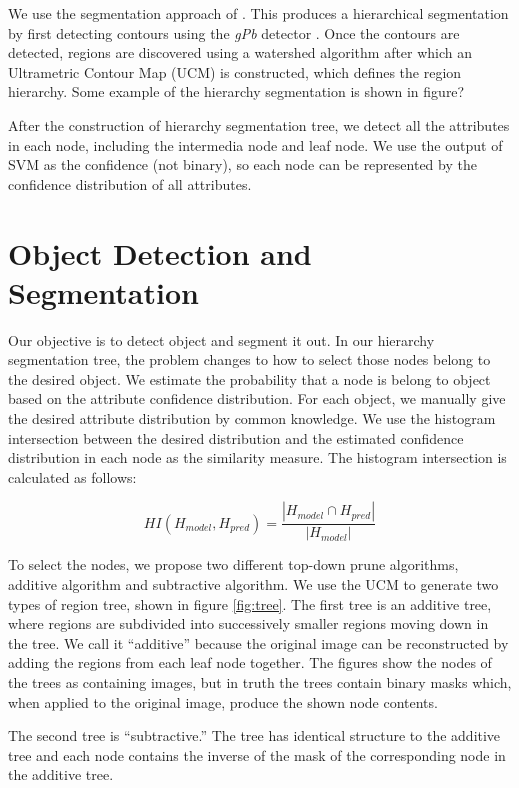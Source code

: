 \documentclass[10pt,twocolumn,letterpaper]{article}
\begin{document}
We use the segmentation
approach of \cite{arbelaez09}.  This produces a hierarchical
segmentation by first detecting contours using the \emph{gPb} detector
\cite{maire08}.  Once the contours are detected, regions are discovered using a
watershed algorithm after which an Ultrametric Contour Map (UCM) is constructed,
which defines the region hierarchy. Some example of the hierarchy segmentation is shown in figure?

After the construction of hierarchy segmentation tree, we detect all the attributes in each node, including the intermedia node and leaf node. We use the output of SVM as the confidence (not binary), so each node can be represented by the confidence distribution of all attributes.


\section{Object Detection and Segmentation}
\label{sec:detection}

Our objective is to detect object and segment it out. In our hierarchy segmentation tree, the problem changes to how to select those nodes belong to the desired object. We estimate the probability that a node is belong to object based on the attribute confidence distribution. For each object, we manually give the desired attribute distribution by common knowledge. We use the histogram intersection between the desired distribution and the estimated confidence distribution in each node as the similarity measure. The histogram intersection is calculated as follows:
 
\[ HI(H_{model},H_{pred}) = \frac{|H_{model} \cap H_{pred}|}{|H_{model}|} \]


To select the nodes, we propose two different top-down prune algorithms, additive algorithm and subtractive algorithm. We use the UCM to generate two types of region tree, shown in figure \ref{fig:tree}.
The first tree is an additive tree, where regions are subdivided into successively
smaller regions moving down in the tree.  We call it ``additive'' because the
original image can be reconstructed by adding the regions from each leaf node
together.  The figures show the nodes of the trees as containing images, but in
truth the trees contain binary masks which, when applied to the original image,
produce the shown node contents.

The second tree is ``subtractive.''  The tree has identical structure to the additive
tree and each node contains the inverse of the mask of the corresponding node
in the additive tree.
\end{document}
